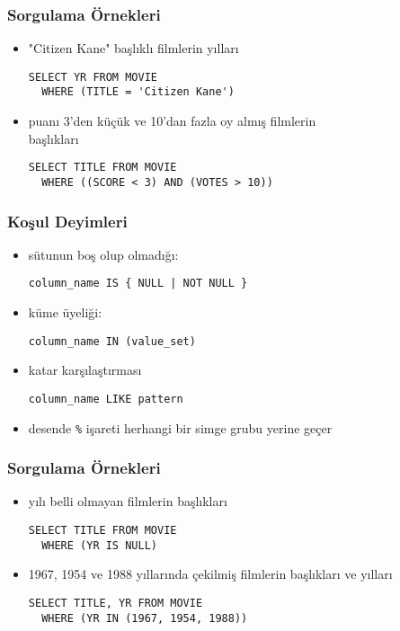 \documentclass[dvipsnames]{beamer}
\theoremstyle{plain}
\begin{document}
\begin{frame}[fragile]
  \frametitle{Sorgulama Örnekleri}

  \begin{itemize}
    \item "Citizen Kane" başlıklı filmlerin yılları
    \begin{lstlisting}
SELECT YR FROM MOVIE
  WHERE (TITLE = 'Citizen Kane')
    \end{lstlisting}


  \pause
  \item puanı 3'den küçük ve 10'dan fazla oy almış filmlerin\\
                başlıkları
    \begin{lstlisting}
SELECT TITLE FROM MOVIE
  WHERE ((SCORE < 3) AND (VOTES > 10))
    \end{lstlisting}
  \end{itemize}
\end{frame}

\begin{frame}[fragile]
  \frametitle{Koşul Deyimleri}

  \begin{itemize}
    \item sütunun boş olup olmadığı:\\
    \begin{lstlisting}
column_name IS { NULL | NOT NULL }
    \end{lstlisting}

    \pause
    \medskip
    \item küme üyeliği:\\
    \begin{lstlisting}
column_name IN (value_set)
    \end{lstlisting}

    \pause
    \medskip
    \item katar karşılaştırması
    \begin{lstlisting}
column_name LIKE pattern
    \end{lstlisting}
    \item desende \lstinline!%! işareti herhangi bir simge grubu yerine geçer
  \end{itemize}
\end{frame}

\begin{frame}[fragile]
  \frametitle{Sorgulama Örnekleri}

  \begin{itemize}
    \item yılı belli olmayan filmlerin başlıkları
    \begin{lstlisting}
SELECT TITLE FROM MOVIE
  WHERE (YR IS NULL)
    \end{lstlisting}

  \pause
  \item 1967, 1954 ve 1988 yıllarında çekilmiş filmlerin başlıkları ve yılları
    \begin{lstlisting}
SELECT TITLE, YR FROM MOVIE
  WHERE (YR IN (1967, 1954, 1988))
    \end{lstlisting}
  \end{itemize}
\end{frame}
\end{document}
